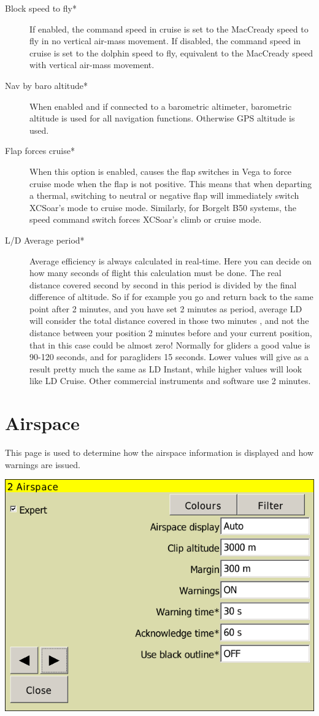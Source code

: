 \begin{description}
\item[Block speed to fly*]  If enabled, the command speed in cruise
 is set to the MacCready speed to fly in no vertical air-mass movement.
 If disabled, the command speed in cruise is set to the dolphin speed to fly,
 equivalent to the MacCready speed with vertical air-mass movement.
\item[Nav by baro altitude*]  When enabled and if connected to a barometric
 altimeter, barometric altitude is used for all navigation functions. Otherwise
 GPS altitude is used.
\item[Flap forces cruise*]
 When this option is enabled, causes the flap switches in Vega to
 force cruise mode when the flap is not positive. This means that
 when departing a thermal, switching to neutral or negative flap will
 immediately switch XCSoar's mode to cruise mode.
 Similarly, for Borgelt B50 systems, the speed command switch forces
 XCSoar's climb or cruise mode.
\item[L/D Average period*]  Average efficiency is always calculated in real-time. 
 Here you can decide on how many seconds of flight this calculation must be done. 
 The real distance covered second by second in this period is divided by the final 
 difference of altitude.  So if for example you go and return back to the same point 
 after 2 minutes, and you have set 2 minutes as period, average LD will consider the 
 total distance covered in those two minutes , and not the distance between your 
 position 2 minutes before and your current position, that in this case could be 
 almost zero! Normally for gliders a good value is 90-120 seconds, and for paragliders 
 15 seconds. Lower values will give as a result pretty much the same as LD Instant, 
 while higher values will look like LD Cruise. Other commercial instruments and 
 software use 2 minutes.
\end{description}


\clearpage
\section{Airspace}

This page is used to determine how the airspace information is
displayed and how warnings are issued.

\begin{center}
\includegraphics[angle=0,width=0.8\linewidth,keepaspectratio='true']{figures/config-airspace.png}
\end{center}

